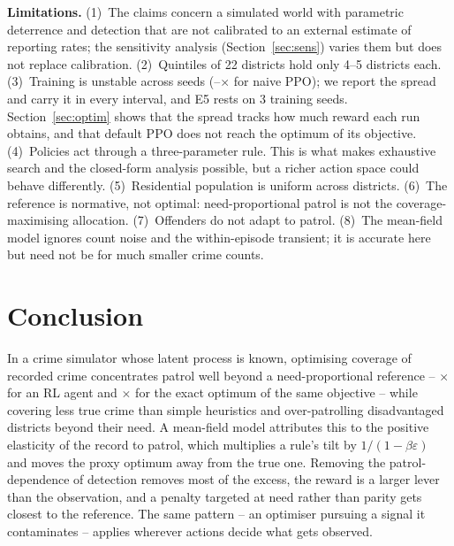 \textbf{Limitations.}
(1)~The claims concern a simulated world with parametric deterrence and detection
that are not calibrated to an external estimate of reporting rates; the
sensitivity analysis (Section~\ref{sec:sens}) varies them but does not replace
calibration.
(2)~Quintiles of 22 districts hold only 4--5 districts each.
(3)~Training is unstable across seeds (\nPPOseedMin--\nPPOseedMax$\times$ for
naive PPO); we report the spread and carry it in every interval, and E5 rests on
3 training seeds. Section~\ref{sec:optim} shows that the spread tracks how much
reward each run obtains, and that default PPO does not reach the optimum of its
objective.
(4)~Policies act through a three-parameter rule. This is what makes exhaustive
search and the closed-form analysis possible, but a richer action space could
behave differently.
(5)~Residential population is uniform across districts.
(6)~The reference is normative, not optimal: need-proportional patrol is not the
coverage-maximising allocation.
(7)~Offenders do not adapt to patrol.
(8)~The mean-field model ignores count noise and the within-episode transient;
it is accurate here but need not be for much smaller crime counts.

\section{Conclusion}
In a crime simulator whose latent process is known, optimising coverage of
recorded crime concentrates patrol well beyond a need-proportional reference
-- \nPPOx$\times$ for an RL agent and \nBRRx$\times$ for the exact optimum of
the same objective -- while covering less true crime than simple heuristics and
over-patrolling disadvantaged districts beyond their need. A mean-field model
attributes this to the positive elasticity of the record to patrol, which
multiplies a rule's tilt by $1/(1-\beta\varepsilon)$ and moves the proxy optimum
away from the true one. Removing the patrol-dependence of detection removes most
of the excess, the reward is a larger lever than the observation, and a penalty
targeted at need rather than parity gets closest to the reference. The same
pattern -- an optimiser pursuing a signal it contaminates -- applies wherever
actions decide what gets observed.
